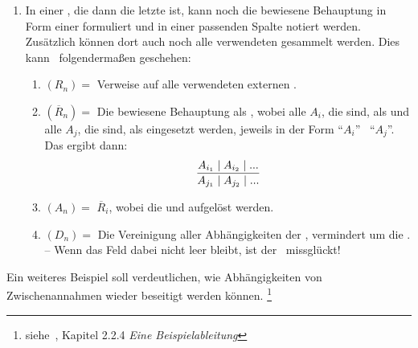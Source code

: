 {\begin{enumerate}
	Nun kann die Zeile beendet werden, oder es geht weiter mit:
	\begin{enumerate}
		\setcounter{enumii}{\value{Enumii}}%
		\item \label{item:Anwendung} $Z_n =$ Die Indizes aller $A_j$ (mit $j < i$), die eine  der  $\overline{R}_i$ sind, möglichst in der verwendeten Reihenfolge.
		-- Für jedes angegebene $j$ werden noch die Abhängigkeiten $D_j$ den Abhängigkeiten $D_i$ hinzugefügt.
		\item $A_i =$ (en) der  $\overline{R}_i$.
		-- Wenn diese  schon als \Aussagen\ $A_j$ (mit $j < i$) vorhanden sind, können auch einfach deren Indizes eingetragen werden.
		Damit werden die Zusammenhänge und der Abschluss des \Beweises\ besser ersichtlich.
		\item $D_i =$ Die Verweise wurden schon in (\ref{item:Anwendung}) eingetragen.%
		\footnote{Wenn $D_n$ leer ist, dann ist $A_n$ allgemeingültig.}
	\end{enumerate}
	Der \Beweis\ muss so lange fortgeführt werden, bis alle  als \Aussagen\ in der Spalte $(A_n)$ erschienen und dort jeweils nur von den gegebenen  abhängig sind.
	\item \label{item:Ergebniszeile} In einer , die dann die letzte ist, kann noch die bewiesene Behauptung in Form einer  formuliert und in einer passenden Spalte notiert werden.
	Zusätzlich können dort auch noch alle verwendeten  gesammelt werden.
	Dies kann \textzB\ folgendermaßen geschehen:
	\begin{enumerate}
		\item $(R_n) =$ Verweise auf alle verwendeten externen .
		\item $(\overline{R}_n) =$ Die bewiesene Behauptung als , wobei alle $A_i$, die  sind, als  und alle $A_j$, die  sind, als  eingesetzt werden, jeweils in der Form \enquote{$A_i$} \textbzgl\ \enquote{$A_j$}.
		Das ergibt dann:
		\[ \frac{A_{i_1} \mid A_{i_2} \mid ...}{A_{j_1} \mid A_{j_2} \mid ...} \]
		\item $(A_n) =$ $\overline{R}_i$, wobei die  und  aufgelöst werden.
		\item $(D_n) =$ Die Vereinigung aller Abhängigkeiten der , vermindert um die .
		-- Wenn das Feld dabei nicht leer bleibt, ist der \Beweis\ missglückt!
	\end{enumerate}
\end{enumerate}
%
Ein weiteres Beispiel  soll verdeutlichen, wie Abhängigkeiten von Zwischenannahmen wieder beseitigt werden können.%
\footnote{siehe~\cite{bib:NatuerlichesSchliessen},
Kapitel 2.2.4 \emph{Eine Beispielableitung}}

}
